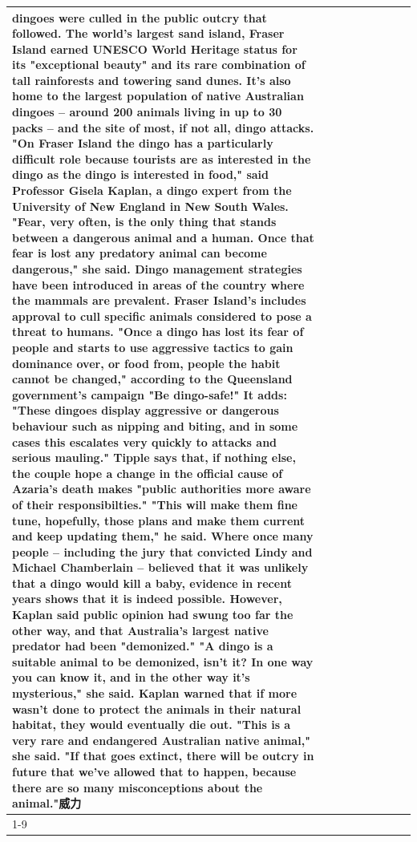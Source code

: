 \begin{table}[H]
\begin{tabular}{lllrlllll}
dingoes were culled in the public outcry that followed. The world's largest sand island, Fraser Island earned UNESCO World Heritage status for its "exceptional beauty" and its rare combination of tall rainforests and towering sand dunes. It's also home to the largest population of native Australian dingoes -- around 200 animals living in up to 30 packs -- and the site of most, if not all, dingo attacks. "On Fraser Island the dingo has a particularly difficult role because tourists are as interested in the dingo as the dingo is interested in food," said Professor Gisela Kaplan, a dingo expert from the University of New England in New South Wales. "Fear, very often, is the only thing that stands between a dangerous animal and a human. Once that fear is lost any predatory animal can become dangerous," she said. Dingo management strategies have been introduced in areas of the country where the mammals are prevalent. Fraser Island's includes approval to cull specific animals considered to pose a threat to humans. "Once a dingo has lost its fear of people and starts to use aggressive tactics to gain dominance over, or food from, people the habit cannot be changed," according to the Queensland government's campaign "Be dingo-safe!" It adds: "These dingoes display aggressive or dangerous behaviour such as nipping and biting, and in some cases this escalates very quickly to attacks and serious mauling." Tipple says that, if nothing else, the couple hope a change in the official cause of Azaria's death makes "public authorities more aware of their responsibilties." "This will make them fine tune, hopefully, those plans and make them current and keep updating them," he said. Where once many people -- including the jury that convicted Lindy and Michael Chamberlain -- believed that it was unlikely that a dingo would kill a baby, evidence in recent years shows that it is indeed possible. However, Kaplan said public opinion had swung too far the other way, and that Australia's largest native predator had been "demonized." "A dingo is a suitable animal to be demonized, isn't it? In one way you can know it, and in the other way it's mysterious," she said. Kaplan warned that if more wasn't done to protect the animals in their natural habitat, they would eventually die out. "This is a very rare and endangered Australian native animal," she said. "If that goes extinct, there will be outcry in future that we've allowed that to happen, because there are so many misconceptions about the animal."威力 \\
\cline{1-9}

\end{tabular}
\end{table}
